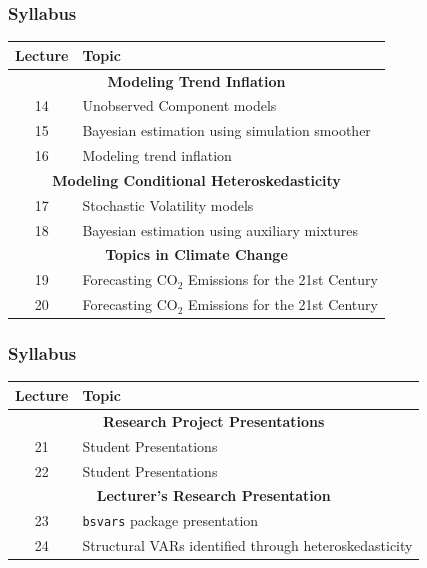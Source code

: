 \documentclass[notes,blackandwhite,mathsans]{beamer}
\begin{document}
\begin{frame}
\frametitle{Syllabus}

\begin{center}
\begin{tabular}{ c l}
\toprule 
Lecture & Topic \\
\midrule
\multicolumn{2}{c}{\textbf{Modeling Trend Inflation}}\\
14  & {\color{mcxs2}Unobserved Component models} \\
15  & {\color{mcxs2}Bayesian estimation using simulation smoother} \\
16  & {\color{mcxs2}Modeling trend inflation} \\[1ex]
\multicolumn{2}{c}{\textbf{Modeling Conditional Heteroskedasticity}}\\
17 & {\color{mcxs2}Stochastic Volatility models} \\
18  & {\color{mcxs2}Bayesian estimation using auxiliary mixtures} \\[1ex]
\multicolumn{2}{c}{\textbf{Topics in Climate Change}}\\
19  & {\color{mcxs2}Forecasting CO$_2$ Emissions for the 21st Century} \\
20  & {\color{mcxs2}Forecasting CO$_2$ Emissions for the 21st Century} \\[1ex]
\bottomrule
\end{tabular}
\end{center}
\end{frame}



\begin{frame}
\frametitle{Syllabus}

\begin{center}
\begin{tabular}{ c l}
\toprule 
Lecture & Topic \\
\midrule
\multicolumn{2}{c}{\textbf{Research Project Presentations}}\\
21  & {\color{mcxs2}Student Presentations} \\
22  & {\color{mcxs2}Student Presentations} \\[1ex]
\multicolumn{2}{c}{\textbf{Lecturer's Research Presentation}}\\
23  & {\color{mcxs2}\texttt{bsvars} package presentation} \\
24  & {\color{mcxs2}Structural VARs identified through heteroskedasticity} \\[1ex]
\bottomrule
\end{tabular}
\end{center}
\end{frame}
\end{document}
